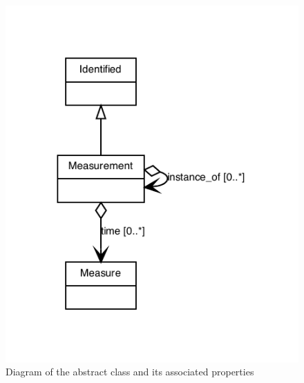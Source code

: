 \begin{figure}[ht]
\begin{center}
\includegraphics[scale=0.6]{figures/Measurement}
\caption[]{Diagram of the  abstract class and its associated properties}
\label{uml:Measurement}
\end{center}
\end{figure}











